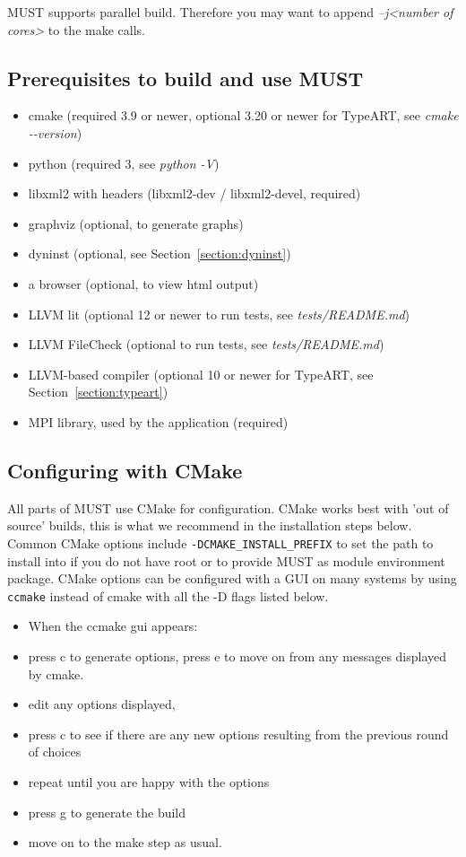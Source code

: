 \documentclass[english]{scrartcl}
\begin{document}
MUST supports parallel build. Therefore you may want
to append \emph{\mbox{--}j\textless number of cores\textgreater} to the make
calls.

\subsection{Prerequisites to build and use MUST}
\label{section:prerequisites}
\begin{itemize}
 \item cmake (required 3.9 or newer, optional 3.20 or newer for TypeART, see \emph{cmake \mbox{-{}-version}})
 \item python (required 3, see \emph{python \mbox{-V}})
 \item libxml2 with headers (libxml2-dev / libxml2-devel, required)
 \item graphviz (optional, to generate graphs)
 \item dyninst (optional, see Section~\ref{section:dyninst})
 \item a browser (optional, to view html output)
 \item LLVM lit (optional 12 or newer to run tests, see \emph{tests/README.md})
 \item LLVM FileCheck (optional to run tests, see \emph{tests/README.md})
 \item LLVM-based compiler (optional 10 or newer for TypeART, see Section~\ref{section:typeart})
 \item MPI library, used by the application (required)
\end{itemize}
\subsection{Configuring with CMake}
All parts of MUST use CMake for configuration.
CMake works best with 'out of source' builds, this is what we recommend in
the installation steps below. 
Common CMake options include \verb|-DCMAKE_INSTALL_PREFIX| to set the path to
install into if you do not have root or to provide MUST as module environment package.
CMake options can be configured with a GUI on many systems by using
\verb|ccmake| instead of cmake with all the -D flags listed below.
\begin{itemize}
     \item When the ccmake gui appears:
     \item press c to generate options, press e to move on from any messages displayed by cmake. 
     \item edit any options displayed, 
     \item press c to see if there are any new options resulting from the previous round of choices
     \item repeat until you are happy with the options
     \item press g to generate the build
     \item move on to the make step as usual.
\end{itemize}
\end{document}
